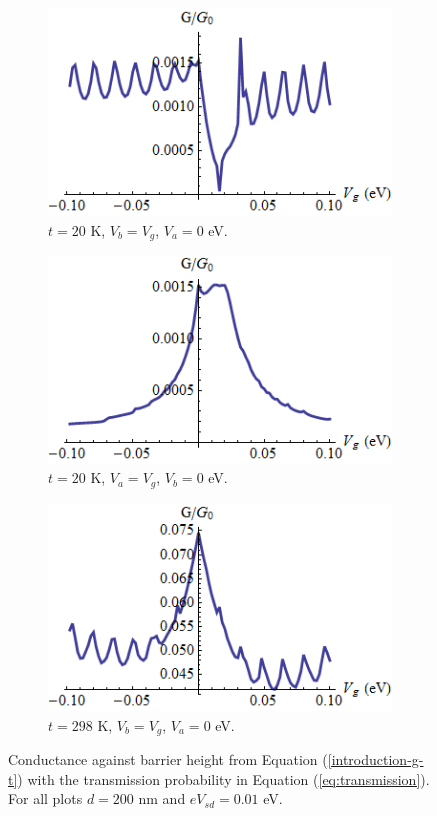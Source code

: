 \documentclass[12pt,a4paper]{report}
\begin{document}
		\begin{figure}[h]
			 \begin{subfigure}[h]{0.3\textwidth}
				\centerline{\includegraphics[scale=0.35]{images/pot-vg-1}}
				\caption{$t=20$ K, $V_{b}=V_{g}$, $V_{a}=0$ eV.}
			\end{subfigure}
			\hspace{0.5cm}
			\begin{subfigure}[h]{0.3\textwidth}
				\centerline{\includegraphics[scale=0.35]{images/pot-vg-2}}
				\caption{$t=20$ K, $V_{a}=V_{g}$, $V_{b}=0$ eV.}
			\end{subfigure}
			\hspace{0.5cm}
			\begin{subfigure}[h]{0.3\textwidth}
				\centerline{\includegraphics[scale=0.35]{images/pot-vg-3}}
				\caption{$t=298$ K, $V_{b}=V_{g}$, $V_{a}=0$ eV.}
			\end{subfigure}
			\caption{Conductance against barrier height from Equation (\ref{introduction-g-t}) with the transmission probability in Equation (\ref{eq:transmission}). For all plots $d=200$ nm and $eV_{sd}=0.01$ eV.}
			\label{pot-vg-1}
		\end{figure}
\end{document}

